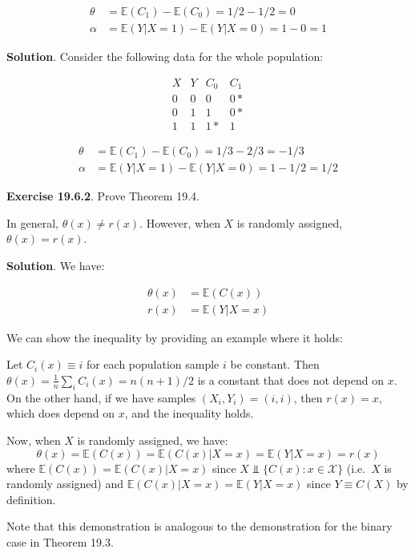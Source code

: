 \begin{align*}
\theta &= \mathbb{E}(C_{1}) - \mathbb{E}(C_{0}) = 1/2 - 1/2 = 0 \\
\alpha &= \mathbb{E}(Y | X = 1) - \mathbb{E}(Y | X = 0) = 1 - 0 = 1
\end{align*}

\textbf{Solution}. Consider the following data for the whole population:

\[
\begin{array}{cccc}
X & Y & C_{0} & C_{1} \\
\hline
0 & 0 & 0 & 0* \\
0 & 1 & 1 & 0* \\
\hline
1 & 1 & 1* & 1
\end{array}
\]

\begin{align*}
\theta &= \mathbb{E}(C_{1}) - \mathbb{E}(C_{0}) = 1/3 - 2/3 = -1/3 \\
\alpha &= \mathbb{E}(Y | X = 1) - \mathbb{E}(Y | X = 0) = 1 - 1/2 = 1/2
\end{align*}

\textbf{Exercise 19.6.2}. Prove Theorem 19.4.

In general, \(\theta(x) \neq r(x)\). However, when \(X\) is randomly assigned, \(\theta(x) = r(x)\).

\textbf{Solution}. We have:

\begin{align*}
\theta(x) &= \mathbb{E}(C(x)) \\
r(x) &= \mathbb{E}(Y | X = x)
\end{align*}

We can show the inequality by providing an example where it holds:

Let \(C_{i}(x) \equiv i\) for each population sample \(i\) be constant. Then \(\theta(x) = \frac{1}{n} \sum_{i} C_{i}(x) = n (n+1) / 2\) is a constant that does not depend on \(x\). On the other hand, if we have samples \((X_{i}, Y_{i}) = (i, i)\), then \(r(x) = x\), which does depend on \(x\), and the inequality holds.

Now, when \(X\) is randomly assigned, we have:
\[
\theta(x) = \mathbb{E}(C(x)) = \mathbb{E}(C(x) | X = x) = \mathbb{E}(Y | X = x) = r(x)
\]
where \(\mathbb{E}(C(x)) = \mathbb{E}(C(x) | X = x)\) since \(X \text{ ⫫  } \{ C(x) : x \in \mathcal{X} \}\) (i.e.~\(X\) is randomly assigned) and \(\mathbb{E}(C(x) | X = x) = \mathbb{E}(Y | X = x)\) since \(Y \equiv C(X)\) by definition.

Note that this demonstration is analogous to the demonstration for the binary case in Theorem 19.3.

